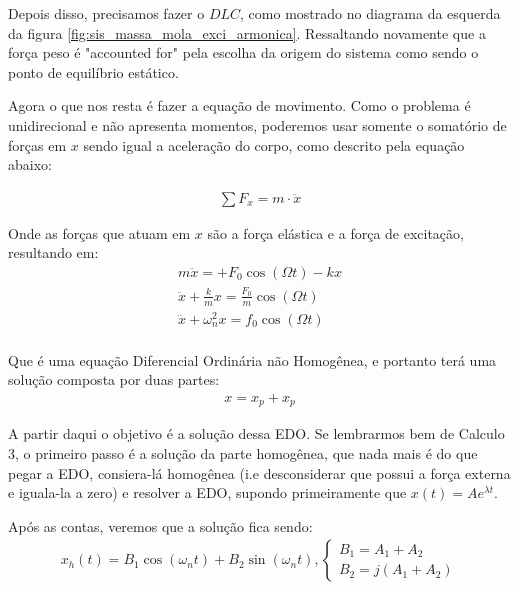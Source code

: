 \documentclass{article}
\begin{document}
                Depois disso, precisamos fazer o $DLC$, como mostrado no diagrama da esquerda da figura \ref{fig:sis_massa_mola_exci_armonica}. Ressaltando novamente que a força peso é "accounted
                for" pela escolha da origem do sistema como sendo o ponto de equilíbrio estático. 

                Agora o que nos resta é fazer a equação de movimento. Como o problema é unidirecional e não apresenta momentos, poderemos usar somente o somatório de forças em $x$ sendo igual a aceleração
                do corpo, como descrito pela equação abaixo:

                \begin{align*}
                    \sum F_x = m \cdot \ddot x
                \end{align*}

                Onde as forças que atuam em $x$ são a força elástica e a força de excitação, resultando em:
                \begin{align*}
                    m \ddot x  = + F_0 \cos(\Omega t) - kx \\ 
                    \ddot x + \frac{k}{m}x = \frac{F_0}{m} \cos (\Omega t) \\ 
                    \ddot x + \omega_n ^2 x = f_0 \cos (\Omega t) \\ 
                \end{align*}

                Que é uma equação Diferencial Ordinária não Homogênea, e portanto terá uma solução composta por duas partes:
                \begin{align*}
                    x = x_p + x_p
                \end{align*}

                A partir daqui o objetivo é a solução dessa EDO. Se lembrarmos bem de Calculo 3, o primeiro passo é a solução da parte homogênea, que nada mais é do que pegar a EDO, consiera-lá homogênea
                (i.e desconsiderar que possui a força externa e iguala-la a zero) e resolver a EDO, supondo primeiramente que $x(t) = A e^{\lambda t}$. 

                Após as contas, veremos que a solução fica sendo: 
                \begin{align*}
                    x_h(t) = B_1 \cos(\omega_n t) + B_2 \sin (\omega_n t), \begin{cases}
                        B_1 = A_1 + A_2 \\ 
                        B_2 = j(A_1 + A_2)
                    \end{cases}
                \end{align*}
\end{document}
